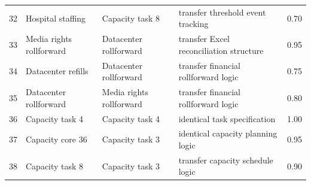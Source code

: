 \documentclass[10pt,landscape]{article}
\begin{document}
\begin{longtable}{@{}r >{\raggedright\arraybackslash}p{3.35cm} >{\raggedright\arraybackslash}p{3.35cm} >{\raggedright\arraybackslash}p{4.75cm} r@{}}
32 & Hospital staffing & Capacity task 8 & transfer threshold event tracking & 0.70 \\
33 & Media rights rollforward & Datacenter rollforward & transfer Excel reconciliation structure & 0.95 \\
34 & Datacenter refills & Datacenter rollforward & transfer financial rollforward logic & 0.75 \\
35 & Datacenter rollforward & Media rights rollforward & transfer financial rollforward logic & 0.80 \\
36 & Capacity task 4 & Capacity task 4 & identical task specification & 1.00 \\
37 & Capacity core 36 & Capacity task 3 & identical capacity planning logic & 0.95 \\
38 & Capacity task 8 & Capacity task 3 & transfer capacity schedule logic & 0.90 \\
\bottomrule
\end{longtable}
\end{document}

